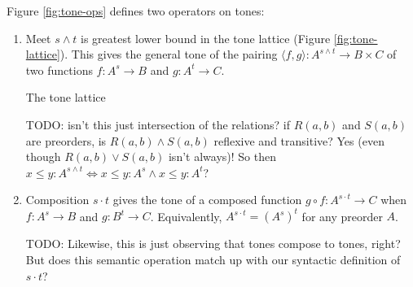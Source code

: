 \documentclass[a4paper]{tufte-handout}
\newcommand{\todo}[1]{{\color{red}#1}}
\newcommand{\ms}[1]{\ensuremath{\mathsf{#1}}}
\newcommand{\id}{\ms{id}}
\newcommand{\op}{\ms{op}}
\newcommand{\iso}{\ms{core}}
\renewcommand{\path}{\ms{path}}
\newcommand{\tm}{\id}                        %
\newcommand{\ta}{{\color{ForestGreen}\op}}   %
\newcommand{\ti}{{\color{NavyBlue}\iso}}     %
\newcommand{\tb}{{\color{Bittersweet}\path}} %
\newcommand{\tc}{\cdot}         %
\begin{document}
Figure \ref{fig:tone-ops} defines two operators on tones:
\begin{enumerate}
\item 
  Meet $s \wedge t$ is greatest lower bound in the tone lattice (Figure
  \ref{fig:tone-lattice}). This gives the general tone of the pairing $\langle
  f, g\rangle : A^{s \wedge t} \to B \times C$ of two functions $f : A^s \to B$
  and $g : A^{t} \to C$.
  \begin{marginfigure}
    \normalsize
    \vspace{0.2cm}
    \caption{The tone lattice}
    \label{fig:tone-lattice}
  \end{marginfigure}


  \todo{TODO: isn't this just intersection of the relations? if $R(a,b)$ and
    $S(a,b)$ are preorders, is $R(a,b) \wedge S(a,b)$ reflexive and transitive?
    Yes (even though $R(a,b) \vee S(a,b)$ isn't always)! So then $x \le y : A^{s
      \wedge t} \iff x \le y : A^s \wedge x \le y : A^t$?}

\item Composition $s \tc t$ gives the tone of a composed function $g \circ f :
  A^{s\tc t} \to C$ when $f : A^s \to B$ and $g : B^t \to C$. Equivalently,
  $A^{s\tc t} = (A^s)^t$ for any preorder $A$.


  \todo{TODO: Likewise, this is just observing that tones compose to tones,
    right? But does this semantic operation match up with our syntactic
    definition of $s \tc t$?}
\end{enumerate}
\end{document}
